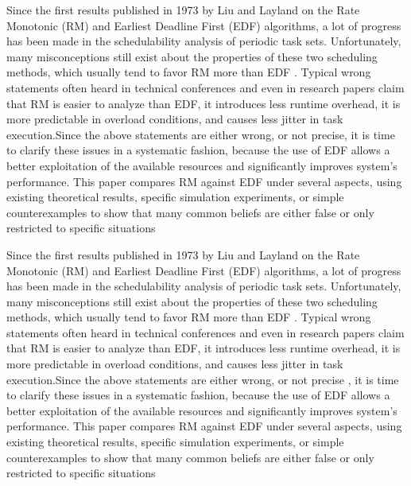 \begin{frame}{\subsecname}
\tiny Since the first results published in 1973 by Liu and Layland on the Rate Monotonic (RM) and Earliest Deadline First (EDF) algorithms, a lot of progress has been made in the schedulability analysis of periodic task sets. Unfortunately, many \Large misconceptions \tiny still exist about the properties of these two scheduling methods, which usually tend to \Large favor RM more than EDF \tiny. Typical wrong statements often heard in technical conferences and even in research papers claim that RM is easier to analyze than EDF, it introduces less runtime overhead, it is more predictable in overload conditions, and causes less jitter in task execution.Since the above statements are either wrong, or not precise, it is time to clarify these issues in a systematic fashion, because the use of EDF allows a better exploitation of the available resources and significantly improves system’s performance. This paper compares RM against EDF under several aspects, using existing theoretical results, specific simulation experiments, or simple counterexamples to show that many common beliefs are either false or only restricted to specific situations
\end{frame}

	\begin{frame}{\subsecname}
\tiny Since the first results published in 1973 by Liu and Layland on the Rate Monotonic (RM) and Earliest Deadline First (EDF) algorithms, a lot of progress has been made in the schedulability analysis of periodic task sets. Unfortunately, many \Large misconceptions \tiny still exist about the properties of these two scheduling methods, which usually tend to \Large favor RM more than EDF \tiny. Typical wrong statements often heard in technical conferences and even in research papers claim that RM is easier to analyze than EDF, it introduces less runtime overhead, it is more predictable in overload conditions, and causes less jitter in task execution.Since the above statements are \Large  either wrong, or not precise \tiny, it is time to clarify these issues in a systematic fashion, because the use of EDF allows a better exploitation of the available resources and significantly improves system’s performance. This paper compares RM against EDF under several aspects, using existing theoretical results, specific simulation experiments, or simple counterexamples to show that many common beliefs are either false or only restricted to specific situations
\end{frame}
	
